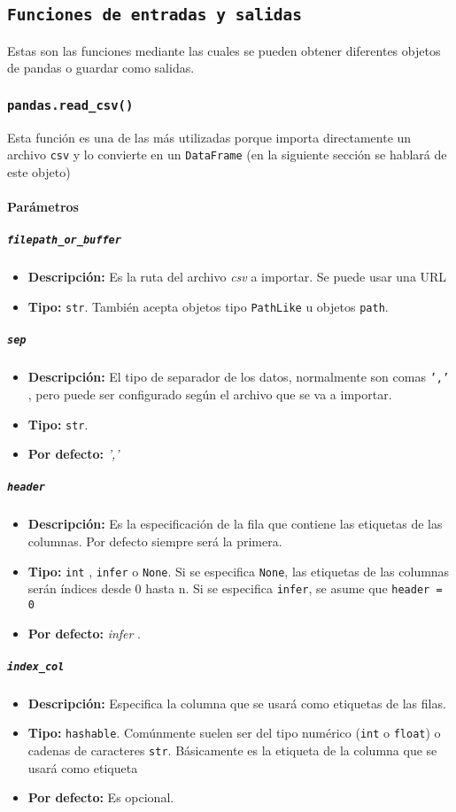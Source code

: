 \subsection{\texttt{Funciones de entradas y salidas}}
Estas son las funciones mediante las cuales se pueden obtener diferentes objetos de pandas o guardar como salidas.
\subsubsection{\texttt{pandas.read\_csv()}}
Esta función es una de las más utilizadas porque importa directamente un archivo \texttt{csv} y lo convierte en un \texttt{DataFrame} (en la siguiente sección se hablará de este objeto)
\paragraph{Parámetros}
\subparagraph{\texttt{filepath\_or\_buffer}}
\begin{itemize}
\item \textbf{Descripción:} Es la ruta del archivo \textit{csv} a importar. Se puede usar una URL
\item \textbf{Tipo:} \texttt{str}. También acepta objetos tipo \texttt{PathLike} u objetos \texttt{path}.
\end{itemize}
\subparagraph{\texttt{sep}}
\begin{itemize}
\item \textbf{Descripción:} El tipo de separador de los datos, normalmente son comas \texttt{','} , pero puede ser configurado según el archivo que se va a importar.
\item \textbf{Tipo:} \texttt{str}. 
\item \textbf{Por defecto:} \textit{','}
\end{itemize}
\subparagraph{\texttt{header}}
\begin{itemize}
\item \textbf{Descripción:} Es la especificación de la fila que contiene las etiquetas de las columnas. Por defecto siempre será la primera.
\item \textbf{Tipo:} \texttt{int} , \texttt{infer} o \texttt{None}. Si se especifica \texttt{None}, las etiquetas de las columnas serán índices desde 0 hasta n. Si se especifica \texttt{infer}, se asume que  \texttt{header = 0}
\item \textbf{Por defecto:} \textit{infer} .
\end{itemize}
\subparagraph{\texttt{index\_col}}
\begin{itemize}
\item \textbf{Descripción:} Especifica la columna que se usará como etiquetas de las filas.
\item \textbf{Tipo:} \texttt{hashable}. Comúnmente suelen ser del tipo numérico (\texttt{int} o \texttt{float}) o cadenas de caracteres \texttt{str}. Básicamente es la etiqueta de la columna que se usará como etiqueta
\item \textbf{Por defecto:}  Es opcional.
\end{itemize}
